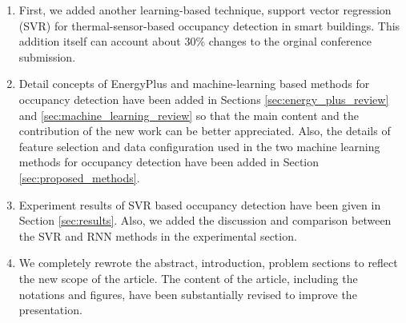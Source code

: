 \begin{enumerate}
\item First, we added another learning-based technique, support vector
  regression (SVR) for thermal-sensor-based occupancy detection in
  smart buildings. This addition itself can account about 30\% changes
  to the orginal conference submission.

\item Detail concepts of EnergyPlus and machine-learning based methods
  for occupancy detection have been added in Sections
  \ref{sec:energy_plus_review} and \ref{sec:machine_learning_review}
  so that the main content and the contribution of the new work can be
  better appreciated. Also, the details of feature selection and data
  configuration used in the two machine learning methods for occupancy
  detection have been added in Section \ref{sec:proposed_methods}.

\item Experiment results of SVR based occupancy detection have been
  given in Section \ref{sec:results}.  Also, we added the discussion
  and comparison between the SVR and RNN methods in the experimental
  section.
    
\item We completely rewrote the abstract, introduction, problem
  sections to reflect the new scope of the article. The content of the
  article, including the notations and figures, have been
  substantially revised to improve the presentation.


%
%
%
%
%
%


\end{enumerate}



%
